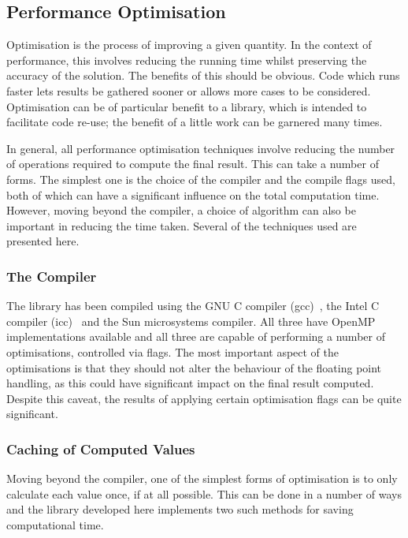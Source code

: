 \subsection{Performance Optimisation}

Optimisation is the process of improving a given quantity.
In the context of performance, this involves reducing the running time whilst
preserving the accuracy of the solution.
The benefits of this should be obvious.
Code which runs faster lets results be gathered sooner or allows more cases to
be considered.
Optimisation can be of particular benefit to a library, which is intended to
facilitate code re-use; the benefit of a little work can be garnered many
times.

In general, all performance optimisation techniques involve reducing the number
of operations required to compute the final result.
This can take a number of forms.
The simplest one is the choice of the compiler and the compile flags used, both
of which can have a significant influence on the total computation time.
However, moving beyond the compiler, a choice of algorithm can also be important
in reducing the time taken.
Several of the techniques used are presented here.

\subsubsection{The Compiler}

The library has been compiled using the GNU C compiler (gcc)~\cite{gcc}, the
Intel C compiler (icc)~\cite{icc} and the Sun microsystems compiler.
All three have OpenMP implementations available and all three are capable of
performing a number of optimisations, controlled via flags.
The most important
aspect of the
optimisations is that they should not alter the behaviour of the floating point
handling, as this could have significant impact on the final result computed.
Despite this caveat, the results of applying certain optimisation flags can be
quite significant.

\subsubsection{Caching of Computed Values}

Moving beyond the compiler, one of the simplest forms of optimisation is to only
calculate each value once, if at all possible.  This can be done in a number of
ways and the library developed here implements two such methods for saving
computational time.

